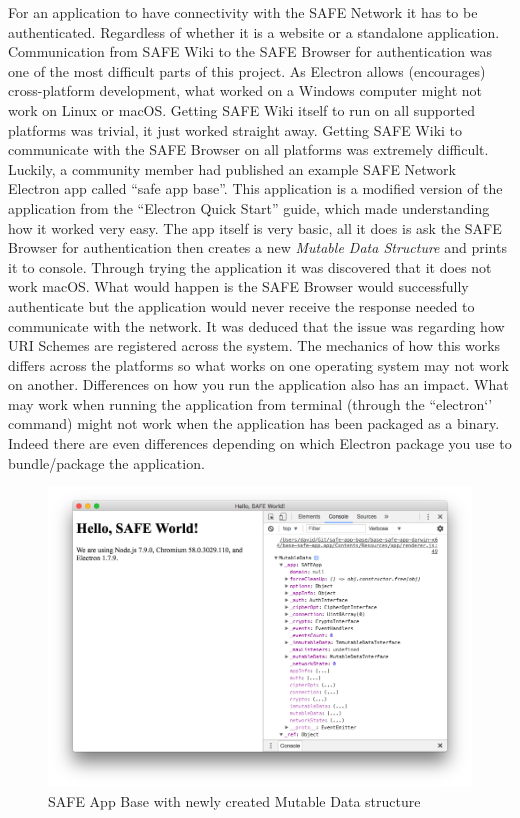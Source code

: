 For an application to have connectivity with the SAFE Network it has to be authenticated. Regardless of whether it is a website or a standalone application. Communication from SAFE Wiki to the SAFE Browser for authentication was one of the most difficult parts of this project. As Electron allows (encourages) cross-platform development, what worked on a Windows computer might not work on Linux or macOS. Getting SAFE Wiki itself to run on all supported platforms was trivial, it just worked straight away. Getting SAFE Wiki to communicate with the SAFE Browser on all platforms was extremely difficult. Luckily, a community member had published an example SAFE Network Electron app called ``safe app base''\cite{safe-app-base}. This application is a modified version of the application from the ``Electron Quick Start'' guide\cite{electron-quick-start}, which made understanding how it worked very easy. The app itself is very basic, all it does is ask the SAFE Browser for authentication then creates a new \textit{Mutable Data Structure} and prints it to console. Through trying the application it was discovered that it does not work macOS. What would happen is the SAFE Browser would successfully authenticate but the application would never receive the response needed to communicate with the network. It was deduced that the issue was regarding how URI Schemes are registered across the system. The mechanics of how this works differs across the platforms so what works on one operating system may not work on another. Differences on how you run the application also has an impact. What may work when running the application from terminal (through the ``electron`' command) might not work when the application has been packaged as a binary. Indeed there are even differences depending on which Electron package you use to bundle/package the application.

\begin{figure}[h]
	\begin{center}
		\includegraphics[width=\textwidth]{images/safe-app-base}
		\caption{SAFE App Base with newly created Mutable Data structure}
		\label{fig:safe-app-base}
	\end{center}
\end{figure}

